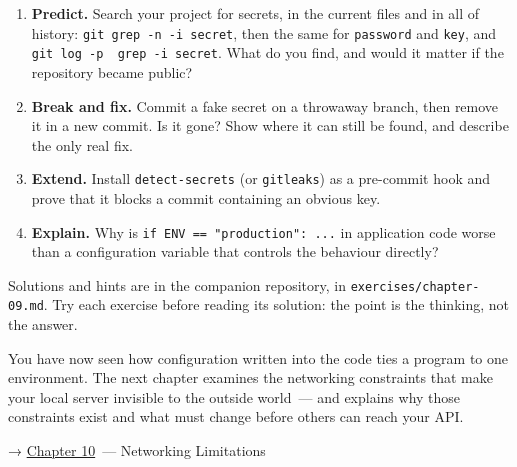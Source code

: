 \begin{enumerate}
\def\labelenumi{\arabic{enumi}.}
\tightlist
\item
  \textbf{Predict.} Search your project for secrets, in the current files and in all of history: \texttt{git\ grep\ -n\ -i\ secret}, then the same for \texttt{password} and \texttt{key}, and \texttt{git\ log\ -}\allowbreak{}\texttt{p\ \textbar{}\ grep\ -}\allowbreak{}\texttt{i\ secret}. What do you find, and would it matter if the repository became public?
\item
  \textbf{Break and fix.} Commit a fake secret on a throwaway branch, then remove it in a new commit. Is it gone? Show where it can still be found, and describe the only real fix.
\item
  \textbf{Extend.} Install \texttt{detect-secrets} (or \texttt{gitleaks}) as a pre-commit hook and prove that it blocks a commit containing an obvious key.
\item
  \textbf{Explain.} Why is \texttt{if\ ENV\ =}\allowbreak{}\texttt{=}\allowbreak{}\texttt{\ "production":}\allowbreak{}\texttt{\ .}\allowbreak{}\texttt{.}\allowbreak{}\texttt{.} in application code worse than a configuration variable that controls the behaviour directly?
\end{enumerate}

\noindent{}Solutions and hints are in the companion repository, in \texttt{exercises/}\allowbreak{}\texttt{chapter-09.md}. Try each exercise before reading its solution: the point is the thinking, not the answer.

\label{09-configuration-coupling:whats-next}

You have now seen how configuration written into the code ties a program to one environment. The next chapter examines the networking constraints that make your local server invisible to the outside world~--- and explains why those constraints exist and what must change before others can reach your API.

\noindent{}→ \hyperref[ch:10-networking-limitations]{Chapter 10}~--- Networking Limitations
